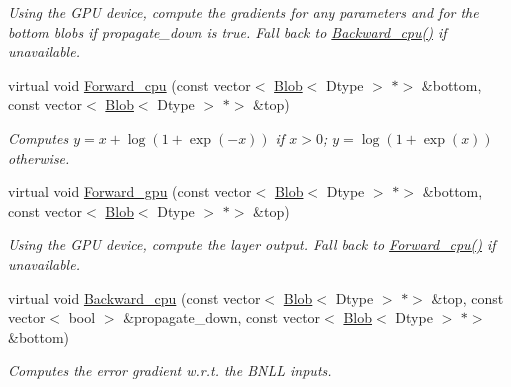 \begin{DoxyCompactItemize}
\begin{DoxyCompactList}\small\item\em Using the G\+PU device, compute the gradients for any parameters and for the bottom blobs if propagate\+\_\+down is true. Fall back to \mbox{\hyperlink{classcaffe_1_1_b_n_l_l_layer_a014a52e7ba756d94d2af865dc6c855dc}{Backward\+\_\+cpu()}} if unavailable. \end{DoxyCompactList}\item 
virtual void \mbox{\hyperlink{classcaffe_1_1_b_n_l_l_layer_ab1b8dfd185c2d896ede4fa8f9368196b}{Forward\+\_\+cpu}} (const vector$<$ \mbox{\hyperlink{classcaffe_1_1_blob}{Blob}}$<$ Dtype $>$ $\ast$$>$ \&bottom, const vector$<$ \mbox{\hyperlink{classcaffe_1_1_blob}{Blob}}$<$ Dtype $>$ $\ast$$>$ \&top)
\begin{DoxyCompactList}\small\item\em Computes $ y = x + \log(1 + \exp(-x)) $ if $ x > 0 $; $ y = \log(1 + \exp(x)) $ otherwise. \end{DoxyCompactList}\item 
\mbox{\label{classcaffe_1_1_b_n_l_l_layer_a1bc9ed3e2ea19df546e070975ddee29b}} 
virtual void \mbox{\hyperlink{classcaffe_1_1_b_n_l_l_layer_a1bc9ed3e2ea19df546e070975ddee29b}{Forward\+\_\+gpu}} (const vector$<$ \mbox{\hyperlink{classcaffe_1_1_blob}{Blob}}$<$ Dtype $>$ $\ast$$>$ \&bottom, const vector$<$ \mbox{\hyperlink{classcaffe_1_1_blob}{Blob}}$<$ Dtype $>$ $\ast$$>$ \&top)
\begin{DoxyCompactList}\small\item\em Using the G\+PU device, compute the layer output. Fall back to \mbox{\hyperlink{classcaffe_1_1_b_n_l_l_layer_ad85abcd4d6afd609be859f0360525102}{Forward\+\_\+cpu()}} if unavailable. \end{DoxyCompactList}\item 
virtual void \mbox{\hyperlink{classcaffe_1_1_b_n_l_l_layer_abd8992bfddeca6c9678d912d4264dff1}{Backward\+\_\+cpu}} (const vector$<$ \mbox{\hyperlink{classcaffe_1_1_blob}{Blob}}$<$ Dtype $>$ $\ast$$>$ \&top, const vector$<$ bool $>$ \&propagate\+\_\+down, const vector$<$ \mbox{\hyperlink{classcaffe_1_1_blob}{Blob}}$<$ Dtype $>$ $\ast$$>$ \&bottom)
\begin{DoxyCompactList}\small\item\em Computes the error gradient w.\+r.\+t. the B\+N\+LL inputs. \end{DoxyCompactList}\item 
\mbox{\label{classcaffe_1_1_b_n_l_l_layer_ac8a7f10b887b59194694f14e887fc6a6}} 

\end{DoxyCompactItemize}
